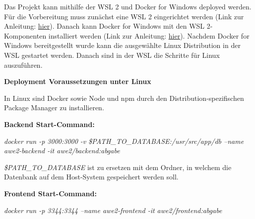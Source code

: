 Das Projekt kann mithilfe der WSL 2 und Docker for Windows deployed werden. Für die Vorbereitung muss zunächst eine WSL 2 eingerichtet werden (Link zur Anleitung: \href{https://docs.microsoft.com/en-us/windows/wsl/install-win10}{hier}). Danach kann Docker for Windows mit den WSL 2-Komponenten installiert werden (Link zur Anleitung: \href{https://docs.docker.com/docker-for-windows/wsl/}{hier}). Nachdem Docker for Windows bereitgestellt wurde kann die ausgewählte Linux Distribution in der WSL gestartet werden. Danach sind in der WSL die Schritte für Linux auszuführen.

\textbf{Deployment Voraussetzungen unter Linux}

In Linux sind Docker sowie Node und npm durch den Distribution-spezifischen Package Manager zu installieren.

\textbf{Backend Start-Command:}

\textit{docker run -p 3000:3000 -v \$PATH\_TO\_DATABASE:/usr/src/app/db --name awe2-backend -it awe2/backend:abgabe}

\textit{\$PATH\_TO\_DATABASE} ist zu ersetzen mit dem Ordner, in welchem die Datenbank auf dem Host-System gespeichert werden soll.

\textbf{Frontend Start-Command:}

\textit{docker run -p 3344:3344 --name awe2-frontend -it awe2/frontend:abgabe}
